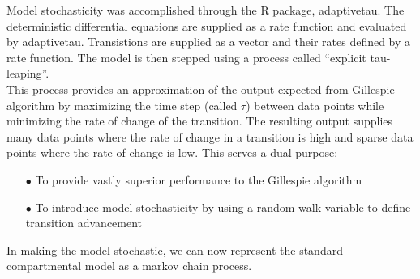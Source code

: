 \documentclass[../Paper.tex]{subfiles}
\begin{document}
\raggedright
Model stochasticity was accomplished through the R package, adaptivetau\cite{johnson_2016}.
The deterministic differential equations are supplied as a rate function and evaluated
by adaptivetau. Transistions are supplied as a vector and their rates defined by
a rate function. The model is then stepped using a process called
``explicit tau-leaping''\cite{yang_gillespie_petzold_2007}.
\\
This process provides an approximation of the output expected from Gillespie algorithm by maximizing
the time step (called $\tau$) between data points while minimizing the rate of change
of the transition. The resulting output supplies many data points where the rate of
change in a transition is high and sparse data points where the rate
of change is low. This serves a dual purpose:

\begin{enumerate}
  \item[$\bullet$]{To provide vastly superior performance to the Gillespie algorithm}
  \item[$\bullet$]{To introduce model stochasticity by using a random walk variable
                   to define transition advancement}
\end{enumerate}

In making the model stochastic, we can now represent the standard compartmental model
as a markov chain process.
\end{document}
